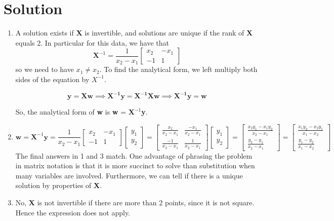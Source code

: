 \documentclass{harvardml}
\theoremstyle{definition}
\theoremstyle{plain}
\newenvironment{solution}
  {\color{blue}\section*{Solution}}
{}
\begin{document}
\begin{solution}
\begin{enumerate}
    \item A solution exists if \textbf{X} is invertible, and solutions are unique if the rank of \textbf{X} equals 2. In particular for this data, we have that \begin{equation*}
        \textbf{X}^{-1} = \frac{1}{x_2-x_1}\begin{bmatrix} x_2 & -x_1 \\ -1 & 1 \end{bmatrix}
    \end{equation*} so we need to have $x_1 \neq x_2$. To find the analytical form, we left multiply both sides of the equation by $X^{-1}$. 
    
    \begin{equation*}
        \textbf{y} = \textbf{Xw} \implies \mathbf{X^{-1}y} = \mathbf{X^{-1}Xw} \implies \mathbf{X^{-1}y} = \textbf{w}
    \end{equation*}
    
    So, the analytical form of \textbf{w} is \textbf{w} = $\mathbf{X}^{-1}$\textbf{y}.
    \item \begin{equation*}
        \mathbf{w} = \mathbf{X}^{-1}\mathbf{y} 
        = \frac{1}{x_2-x_1}\begin{bmatrix} x_2 & -x_1 \\ -1 & 1 \end{bmatrix} \begin{bmatrix} y_1 \\ y_2 \end{bmatrix} 
        = \begin{bmatrix} \frac{x_2}{x_2-x_1} & \frac{-x_1}{x_2-x_1} \\ \frac{-1}{x_2-x_1} & \frac{1}{x_2-x_1} \end{bmatrix} \begin{bmatrix} y_1 \\ y_2 \end{bmatrix} 
        = \begin{bmatrix} \frac{x_2y_1-x_1y_2}{x_2-x_1} \\ \frac{y_2-y_1}{x_2-x_1}\end{bmatrix} 
        = \begin{bmatrix} \frac{x_1y_2-x_2y_1}{x_1-x_2} \\ \frac{y_1-y_2}{x_1-x_2}\end{bmatrix} 
    \end{equation*}
    The final answers in 1 and 3 match. One advantage of phrasing the problem in matrix notation is that it is more succinct to solve than substitution when many variables are involved. Furthermore, we can tell if there is a unique solution by properties of \textbf{X}. 
    \item No, \textbf{X} is not invertible if there are more than 2 points, since it is not square. Hence the expression does not apply. 
\end{enumerate}
\end{solution}
\end{document}
